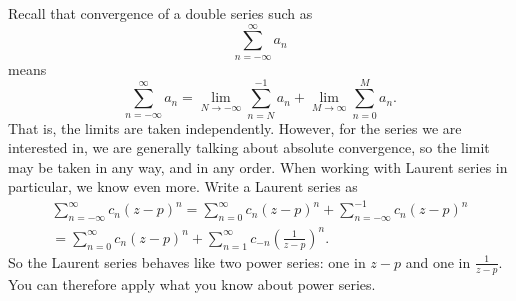 \documentclass[12pt,openany]{book}
\theoremstyle{plain}
\theoremstyle{remark}
\theoremstyle{definition}
\theoremstyle{exercise}
\theoremstyle{example}
\begin{document}
Recall that convergence of a double series such as
\begin{equation*}
\sum_{n=-\infty}^{\infty} a_n
\end{equation*}
means
\begin{equation*}
\sum_{n=-\infty}^{\infty} a_n
=
\lim_{N\to -\infty}
\sum_{n=N}^{-1} a_n
+
\lim_{M\to \infty}
\sum_{n=0}^{M} a_n .
\end{equation*}
That is, the limits are taken independently.  However, for the series we
are interested in, we are generally talking
about absolute convergence, so the limit may be taken in any way,
and in any order.
When working with Laurent series in particular, we know even more.
Write a Laurent series as 
\begin{multline*}
\sum_{n=-\infty}^{\infty} c_n {(z-p)}^n
=
\sum_{n=0}^{\infty} c_n {(z-p)}^n
+
\sum_{n=-\infty}^{-1} c_n {(z-p)}^n
\\
=
\sum_{n=0}^{\infty} c_n {(z-p)}^n
+
\sum_{n=1}^{\infty} c_{-n} {\left(\frac{1}{z-p}\right)}^n .
\end{multline*}
So the Laurent series behaves like two power series: one in $z-p$ and one
in $\frac{1}{z-p}$.  You can therefore apply what you know about power
series.
\end{document}

